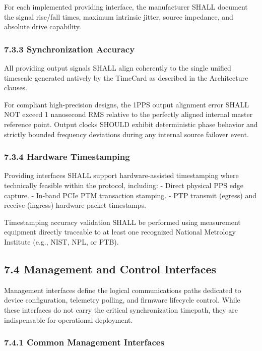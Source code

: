 For each implemented providing interface, the manufacturer SHALL
document the signal rise/fall times, maximum intrinsic jitter, source
impedance, and absolute drive capability.

\subsubsection{7.3.3 Synchronization
Accuracy}\label{synchronization-accuracy}

All providing output signals SHALL align coherently to the single
unified timescale generated natively by the TimeCard as described in the
Architecture clauses.

For compliant high-precision designs, the 1PPS output alignment error
SHALL NOT exceed 1 nanosecond RMS relative to the perfectly aligned
internal master reference point. Output clocks SHOULD exhibit
deterministic phase behavior and strictly bounded frequency deviations
during any internal source failover event.

\subsubsection{7.3.4 Hardware
Timestamping}\label{hardware-timestamping-1}

Providing interfaces SHALL support hardware-assisted timestamping where
technically feasible within the protocol, including: - Direct physical
PPS edge capture. - In-band PCIe PTM transaction stamping. - PTP
transmit (egress) and receive (ingress) hardware packet timestamps.

Timestamping accuracy validation SHALL be performed using measurement
equipment directly traceable to at least one recognized National
Metrology Institute (e.g., NIST, NPL, or PTB).

\subsection{7.4 Management and Control
Interfaces}\label{management-and-control-interfaces}

Management interfaces define the logical communications paths dedicated
to device configuration, telemetry polling, and firmware lifecycle
control. While these interfaces do not carry the critical
synchronization timepath, they are indispensable for operational
deployment.

\subsubsection{7.4.1 Common Management
Interfaces}\label{common-management-interfaces}

